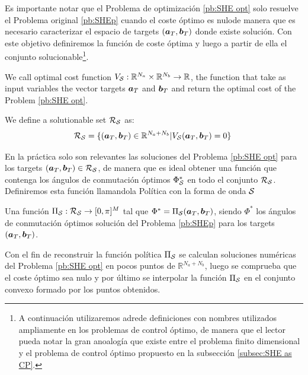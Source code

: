 \documentclass[twocolumn]{autart}    %
\begin{document}
\JOStart
\vspace{-1.0em}

Es importante notar que el Problema de optimización \ref{pb:SHE opt} solo resuelve el Problema original \ref{pb:SHEp} cuando el coste óptimo es nulode manera que es necesario caracterizar el  espacio de targets $(\bm{a}_T,\bm{b}_T) $ donde existe solución. Con este objetivo definiremos la función de coste óptima y luego a partir de ella el conjunto solucionable\footnote{A continuación utilizaremos adrede definiciones con nombres utilizados ampliamente en los problemas de control óptimo, de manera que el lector pueda notar la gran anoalogía que existe entre el problema finito dimensional y el problema de control óptimo propuesto en la subsección \ref{subsec:SHE as CP}.}. 
\vspace{1em}
\begin{definition}
	We call optimal cost function $V_{\mathcal{S}}:\mathbb{R}^{N_a}\times \mathbb{R}^{N_b} \rightarrow \mathbb{R}$, the function that take as input variables the vector targets $\bm{a}_T$ and $\bm{b}_T$ and return the optimal cost of the Problem \ref{pb:SHE opt}.
\end{definition}

\vspace{1em}
\begin{definition}
	We define a solutionable set $\mathcal{R}_{\mathcal{S}}$ as:
	\begin{gather}
		\mathcal{R}_{\mathcal{S}} = \{ (\bm{a}_T,\bm{b}_T) \in \mathbb{R}^{N_a+N_b} | V_{\mathcal{S}}(\bm{a}_T,\bm{b}_T) = 0\}\
	\end{gather}
\end{definition}
En la práctica solo son relevantes las soluciones del Problema \ref{pb:SHE opt} para los targets $(\bm{a}_T,\bm{b}_T) \in \mathcal{R}_{\mathcal{S}}$, de manera que es ideal obtener una función que contenga  los ángulos de conmutación óptimos $\Phi^*_{\mathcal{S}}$ en todo el conjunto $\mathcal{R}_{\mathcal{S}}$. Definiremos  esta función llamandola Política con la forma de onda $\mathcal{S}$

\vspace{1em}
\begin{definition}
Una función $\Pi_{\mathcal{S}}: \mathcal{R}_{\mathcal{S}} \rightarrow [0,\pi]^M$ tal que $\Phi^* = \Pi_{\mathcal{S}}(\bm{a}_T,\bm{b}_T)$, siendo $\Phi^*$ los ángulos de conmutación óptimos solución del Problema \ref{pb:SHEp} para los targets $(\bm{a}_T,\bm{b}_T)$.
\end{definition} 

Con el fin de reconstruir la función política $\Pi_{\mathcal{S}}$ se calculan soluciones numéricas del Problema \ref{pb:SHE opt} en pocos puntos de $\mathbb{R}^{N_a+N_b}$, luego se comprueba que el coste óptimo sea nulo y por último se interpolar la función $\Pi_{\mathcal{S}}$ en el conjunto convexo formado por los puntos obtenidos. 
\end{document}
